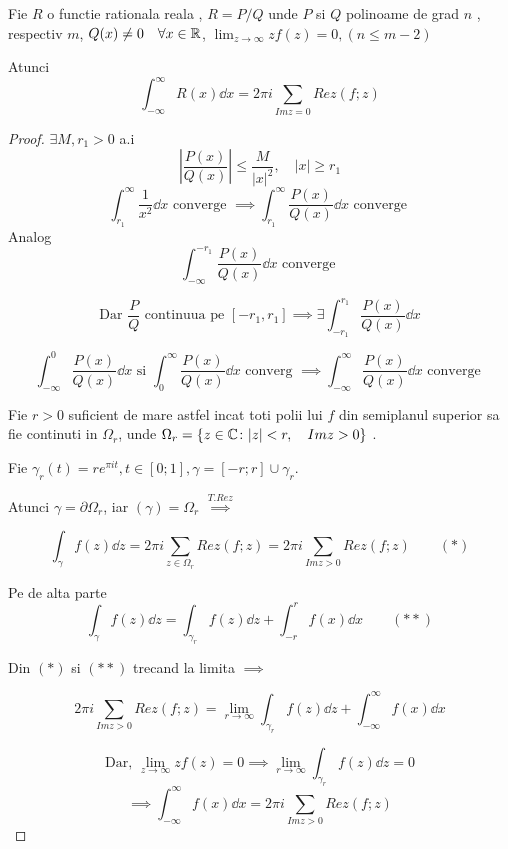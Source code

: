 \begin{tip}
    Fie $R$ o functie rationala reala , $R=P / Q$ unde $P$ si $Q$ polinoame de
    grad $n$ , respectiv $m$, $Q(x)\neq 0 \quad \forall x\in \mathbb{R}$,
    $\displaystyle \lim_{z\to\infty} z f(z) =0, (n \leq m-2)$

        Atunci
    \[
        \int_{-\infty}^{\infty} R(x) \dd x = 2\pi i \sum_{Im z = 0} Rez(f;z)
    \]
    \begin{proof}
        $\exists M,r_1 >0 $ a.i
        \[
            \left|\frac{P(x)}{Q(x)} \right| \leq \frac{M}{|x|^2} , \quad |x| \geq r_1
        \]
        \[
            \int_{r_1}^{\infty} \frac{1}{x^2} \dd x \text{ converge } \implies
            \int_{r_1}^{\infty} \frac{P(x)}{Q(x)} \dd x \text{ converge }
        \]
        Analog
        \[
           \int_{ - \infty}^{- r_1} \frac{P(x)}{Q(x)} \dd x \text{ converge }
        \]

                \[
                    \text{Dar } \frac{P}{Q} \text{ continuua pe } [- r_1, r_1] \implies
            \exists \int_{- r_1}^{r_1} \frac{P(x)}{Q(x)} \dd x
                \]

        \[
            \int_{- \infty}^{0} \frac{P(x)}{Q(x)} \dd x \text{ si }
            \int_{0}^{\infty} \frac{P(x)}{Q(x)} \dd x \text{ converg } \implies
            \int_{- \infty}^{\infty} \frac{P(x)}{Q(x)} \dd x \text{ converge }
        \]

        Fie $r>0$ suficient de mare astfel incat toti polii lui $f$ din semiplanul
        superior sa fie continuti in $\Omega_r$, unde $\Omega_r = \{z\in\mathbb{C} \colon |z| < r,\quad Im z > 0\}$ .

                Fie $\gamma_r(t) = r e^{\pi i t}, t\in[0;1], \gamma=[-r;r]\cup \gamma_r$.

                Atunci $\gamma = \partial \Omega_r$, iar $(\gamma) = \Omega_r$
        $\overset{T. Rez}{\implies}$

        \begin{equation*}
            \int_{\gamma} f(z) \dd z = 2 \pi i \sum_{z \in \Omega_r} Rez(f;z)
                = 2 \pi i \sum_{Im z >0} Rez(f;z)  \qquad (*)
        \end{equation*}

        Pe de alta parte
        \begin{equation*}
            \int_{\gamma} f(z) \dd z = \int_{\gamma_r} f(z) \dd z + \int_{-r}^{r} f(x) \dd x \qquad (**)
        \end{equation*}

        Din $(*)$ si $(**)$ trecand la limita $\implies$

        \[
            2 \pi i \sum_{Im z >0} Rez(f;z) = \lim_{r\to \infty} \int_{\gamma_r} f(z) \dd z
                + \int_{- \infty}^{\infty} f(x) \dd x
        \]

        \[
            \text{Dar, } \lim_{z\to\infty} z f(z)=0 \implies \lim_{r\to\infty} \int_{\gamma_r} f(z) \dd z = 0
        \]
        \[
            \implies \int_{- \infty}^{\infty} f(x) \dd x = 2 \pi i \sum_{Im z >0} Rez(f;z)
        \]
    \end{proof}
\end{tip}


